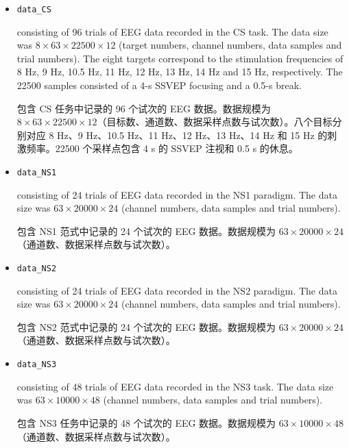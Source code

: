 \documentclass[11pt]{ctexart}
\newenvironment{en}{\begin{enbox}\color{black!85}}{\end{enbox}}
\newenvironment{zh}{\begin{zhbox}}{\end{zhbox}}
\begin{document}
\begin{itemize}
\item \texttt{data\_CS}
\begin{en}
consisting of 96 trials of EEG data recorded in the CS task. The data size was $8\times63\times22500\times12$ (target numbers, channel numbers, data samples and trial numbers). The eight targets correspond to the stimulation frequencies of 8 Hz, 9 Hz, 10.5 Hz, 11 Hz, 12 Hz, 13 Hz, 14 Hz and 15 Hz, respectively. The 22500 samples consisted of a 4-s SSVEP focusing and a 0.5-s break.
\end{en}
\begin{zh}
包含 CS 任务中记录的 96 个试次的 EEG 数据。数据规模为 $8\times63\times22500\times12$（目标数、通道数、数据采样点数与试次数）。八个目标分别对应 8 Hz、9 Hz、10.5 Hz、11 Hz、12 Hz、13 Hz、14 Hz 和 15 Hz 的刺激频率。22500 个采样点包含 4 s 的 SSVEP 注视和 0.5 s 的休息。
\end{zh}

\item \texttt{data\_NS1}
\begin{en}
consisting of 24 trials of EEG data recorded in the NS1 paradigm. The data size was $63\times20000\times24$ (channel numbers, data samples and trial numbers).
\end{en}
\begin{zh}
包含 NS1 范式中记录的 24 个试次的 EEG 数据。数据规模为 $63\times20000\times24$（通道数、数据采样点数与试次数）。
\end{zh}

\item \texttt{data\_NS2}
\begin{en}
consisting of 24 trials of EEG data recorded in the NS2 paradigm. The data size was $63\times20000\times24$ (channel numbers, data samples and trial numbers).
\end{en}
\begin{zh}
包含 NS2 范式中记录的 24 个试次的 EEG 数据。数据规模为 $63\times20000\times24$（通道数、数据采样点数与试次数）。
\end{zh}

\item \texttt{data\_NS3}
\begin{en}
consisting of 48 trials of EEG data recorded in the NS3 task. The data size was $63\times10000\times48$ (channel numbers, data samples and trial numbers).
\end{en}
\begin{zh}
包含 NS3 任务中记录的 48 个试次的 EEG 数据。数据规模为 $63\times10000\times48$（通道数、数据采样点数与试次数）。
\end{zh}
\end{itemize}
\end{document}
